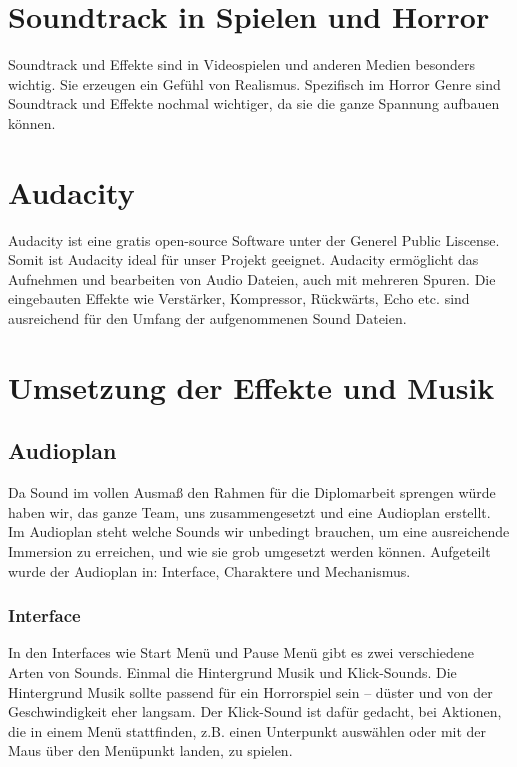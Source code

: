 \section{Soundtrack in Spielen und Horror}
Soundtrack und Effekte sind in Videospielen und anderen Medien besonders wichtig.
Sie erzeugen ein Gefühl von Realismus. Spezifisch im Horror Genre sind Soundtrack und Effekte nochmal wichtiger, da sie die ganze Spannung aufbauen können.

\section{Audacity}
Audacity ist eine gratis open-source Software unter der Generel Public Liscense.
Somit ist Audacity ideal für unser Projekt geeignet. Audacity ermöglicht das Aufnehmen und bearbeiten von Audio Dateien, auch mit mehreren Spuren.
Die eingebauten Effekte wie Verstärker, Kompressor, Rückwärts, Echo etc. sind ausreichend für den Umfang der aufgenommenen Sound Dateien.

\section{Umsetzung der Effekte und Musik}
\subsection{Audioplan}
Da Sound im vollen Ausmaß den Rahmen für die Diplomarbeit sprengen würde haben wir, das ganze Team, uns zusammengesetzt und eine
Audioplan erstellt. Im Audioplan steht welche Sounds wir unbedingt brauchen,
um eine ausreichende Immersion zu erreichen, und wie sie grob umgesetzt werden können. Aufgeteilt wurde der Audioplan in: Interface, Charaktere und Mechanismus.

\subsubsection{Interface}
In den Interfaces wie Start Menü und Pause Menü gibt es zwei verschiedene Arten von Sounds. Einmal die Hintergrund Musik und Klick-Sounds.
Die Hintergrund Musik sollte passend für ein Horrorspiel sein – düster und von der Geschwindigkeit eher langsam.
Der Klick-Sound ist dafür gedacht, bei Aktionen, die in einem Menü stattfinden, z.B. einen Unterpunkt auswählen oder mit der Maus über den Menüpunkt landen, zu spielen.

